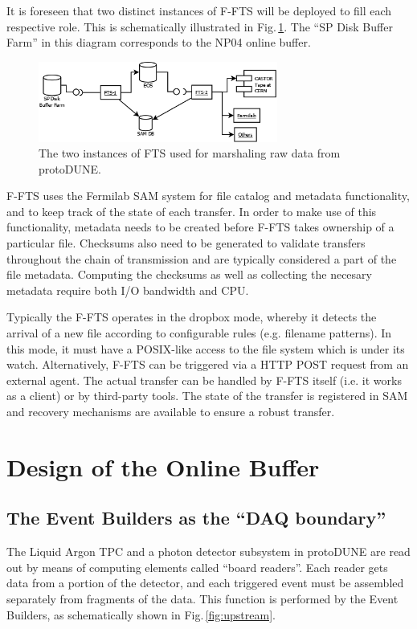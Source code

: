 \documentclass[pdftex,12pt,letter]{article}
\newcommand{\pd}{protoDUNE\xspace}
\begin{document}
\noindent It is foreseen that two distinct instances of F-FTS will be deployed to fill each
respective role. This is schematically illustrated in Fig.\,\ref{fig:ftsinstances}. The ``SP Disk
Buffer Farm'' in this diagram corresponds to the NP04 online buffer.

\begin{figure}[tbh]
  \centering
  \includegraphics[width=0.7\textwidth]{figures/ftsinstances_v2.png}
  \caption{The two instances of FTS used for marshaling raw data from protoDUNE.}
  \label{fig:ftsinstances}
\end{figure}

 \noindent F-FTS uses the Fermilab SAM system for file catalog and metadata functionality,
and to keep track of the state of each transfer. In order to make use of this functionality, metadata
needs to be created before F-FTS takes ownership of a particular file. Checksums also need to be
generated to validate transfers throughout the chain of transmission and are typically considered
a part of the file metadata. Computing the checksums
as well as collecting the necesary metadata require both I/O bandwidth and CPU.

Typically the F-FTS operates in the dropbox mode, whereby it detects the arrival of a new file
according to configurable rules (e.g. filename patterns). In this mode, it must have a POSIX-like access to the file
system which is under its watch. Alternatively, F-FTS can be triggered via a HTTP POST request
from an external agent. The actual transfer can be handled by F-FTS itself (i.e. it works
as a client) or by third-party tools. The state of the transfer is registered in SAM
and recovery mechanisms are available to ensure a robust transfer.

\section{Design of the Online Buffer}
\subsection{The Event Builders as the ``DAQ boundary''}
The Liquid Argon TPC  and a photon detector subsystem in \pd are read out by means of
computing elements called ``board readers''. Each reader gets data from a portion of the detector,
and each triggered event must be assembled separately from fragments of the data. This function
is performed by the Event Builders, as schematically shown in Fig.\,\ref{fig:upstream}.
\end{document}
